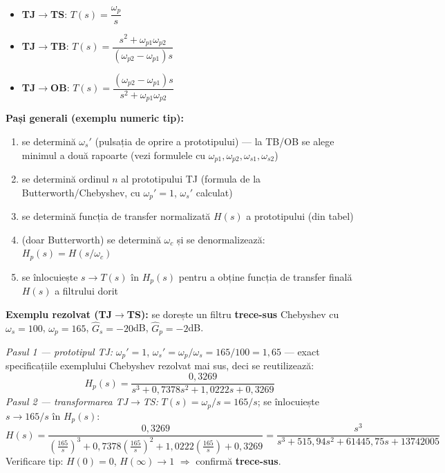 \documentclass[10pt,a4paper]{article}
\begin{document}
\begin{keyeq}\color{red!65!black}
\begin{itemize}
\item \textbf{TJ$\to$TS}: $T(s)=\dfrac{\omega_p}{s}$
\item \textbf{TJ$\to$TB}: $T(s)=\dfrac{s^2+\omega_{p1}\omega_{p2}}{(\omega_{p2}-\omega_{p1})s}$
\item \textbf{TJ$\to$OB}: $T(s)=\dfrac{(\omega_{p2}-\omega_{p1})s}{s^2+\omega_{p1}\omega_{p2}}$
\end{itemize}
\end{keyeq}

\textbf{Pași generali (exemplu numeric tip):}
\begin{enumerate}
\item se determină $\omega_s'$ (pulsația de oprire a prototipului) — la TB/OB se alege minimul a două rapoarte (vezi formulele cu $\omega_{p1},\omega_{p2},\omega_{s1},\omega_{s2}$)
\item se determină ordinul $n$ al prototipului TJ (formula de la Butterworth/Chebyshev, cu $\omega_p'=1$, $\omega_s'$ calculat)
\item se determină funcția de transfer normalizată $H(s)$ a prototipului (din tabel)
\item (doar Butterworth) se determină $\omega_c$ și se denormalizează: $H_p(s)=H(s/\omega_c)$
\item se înlocuiește $s\to T(s)$ în $H_p(s)$ pentru a obține funcția de transfer finală $H(s)$ a filtrului dorit
\end{enumerate}

\textbf{Exemplu rezolvat (TJ$\to$TS):} se dorește un filtru \textbf{trece-sus} Chebyshev cu $\omega_s=100$, $\omega_p=165$, $\hat G_s=-20$dB, $\hat G_p=-2$dB.

\textit{Pasul 1 — prototipul TJ:} $\omega_p'=1$, $\omega_s'=\omega_p/\omega_s=165/100=1{,}65$ — exact specificațiile exemplului Chebyshev rezolvat mai sus, deci se reutilizează:
$$H_p(s)=\dfrac{0{,}3269}{s^3+0{,}7378s^2+1{,}0222s+0{,}3269}$$
\textit{Pasul 2 — transformarea TJ$\to$TS:} $T(s)=\omega_p/s=165/s$; se înlocuiește $s\to165/s$ în $H_p(s)$:
$$H(s)=\dfrac{0{,}3269}{\left(\frac{165}{s}\right)^3+0{,}7378\left(\frac{165}{s}\right)^2+1{,}0222\left(\frac{165}{s}\right)+0{,}3269}=\dfrac{s^3}{s^3+515{,}94s^2+61445{,}75s+13742005}$$
Verificare tip: $H(0)=0$, $H(\infty)\to1$ $\Rightarrow$ confirmă \textbf{trece-sus}.
\end{document}
